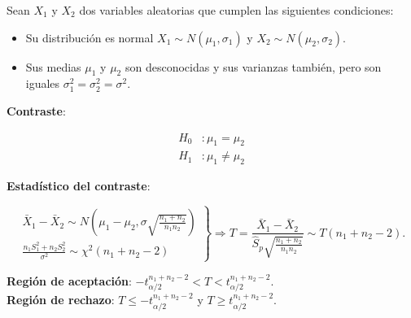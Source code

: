 \documentclass[
  a4paper,
]{scrreport}
\providecommand{\tightlist}{%
  \setlength{\itemsep}{0pt}\setlength{\parskip}{0pt}}\usepackage{longtable,booktabs,array}
\theoremstyle{definition}
\theoremstyle{definition}
\theoremstyle{plain}
\theoremstyle{remark}
\begin{document}
Sean \(X_1\) y \(X_2\) dos variables aleatorias que cumplen las
siguientes condiciones:

\begin{itemize}
\tightlist
\item
  Su distribución es normal \(X_1\sim N(\mu_1,\sigma_1)\) y
  \(X_2\sim N(\mu_2,\sigma_2)\).
\item
  Sus medias \(\mu_1\) y \(\mu_2\) son desconocidas y sus varianzas
  también, pero son iguales \(\sigma^2_1=\sigma^2_2=\sigma^2\).
\end{itemize}

\textbf{Contraste}:

\[
\begin{aligned}
H_0 &: \mu_1=\mu_2 \\
H_1 &: \mu_1\neq \mu_2
\end{aligned}
\]

\textbf{Estadístico del contraste}:

\[
\left.
\begin{array}{l}
\bar{X}_1-\bar{X}_2\sim N\left(\mu_1-\mu_2,\sigma\sqrt{\frac{n_1+n_2}{n_1n_2}} \right) \\
\displaystyle \frac{n_1S_1^2+n_2S_2^2}{\sigma^2} \sim \chi^2(n_1+n_2-2)
\end{array}
\right\}
\Rightarrow
T=\frac{\bar{X}_1-\bar{X}_2}{\hat{S}_p\sqrt{\frac{n_1+n_2}{n_1n_2}}} \sim T(n_1+n_2-2).
\]

\textbf{Región de aceptación}:
\(-t_{\alpha/2}^{n_1+n_2-2} < T < t_{\alpha/2}^{n_1+n_2-2}\).\\
\textbf{Región de rechazo}: \(T\leq -t_{\alpha/2}^{n_1+n_2-2}\) y
\(T\geq t_{\alpha/2}^{n_1+n_2-2}\).
\end{document}

